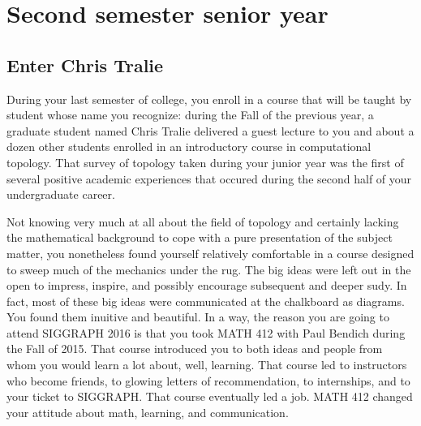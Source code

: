 \documentclass[../main.tex]{subfiles}
\begin{document}
\section{Second semester senior year}

\subsection{Enter Chris Tralie}
 
During your last semester of college, you enroll in a course that will be taught by student whose name you recognize: during the Fall of the previous year, a graduate student named Chris Tralie delivered a guest lecture to you and about a dozen other students enrolled in an introductory course in computational topology. That survey of topology taken during your junior year was the first of several positive academic experiences that occured during the second half of your undergraduate career.

Not knowing very much at all about the field of topology and certainly lacking the mathematical background to cope with a pure presentation of the subject matter, you nonetheless found yourself relatively comfortable in a course designed to sweep much of the mechanics under the rug. The big ideas were left out in the open to impress, inspire, and possibly encourage subsequent and deeper sudy. In fact, most of these big ideas were communicated at the chalkboard as diagrams. You found them inuitive and beautiful. In a way, the reason you are going to attend SIGGRAPH 2016 is that you took MATH 412 with Paul Bendich during the Fall of 2015. That course introduced you to both ideas and people from whom you would learn a lot about, well, learning. That course led to instructors who become friends, to glowing letters of recommendation, to internships, and to your ticket to SIGGRAPH. That course eventually led a job. MATH 412 changed your attitude about math, learning, and communication.
\end{document}
